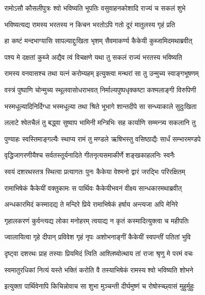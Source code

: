 \twolineshloka
{रामोऽसौ कौसलीपुत्रः श्वो भविष्यति भूपतिः}
{वसुवाहनकोशादि राज्यं च सकलं शुभे} %

\twolineshloka
{भविष्यत्यद्य रामस्य भरतस्य न किचन}
{भरतोऽपि गतो दूरं मातुलस्य गृहं प्रति} %

\twolineshloka
{हा कष्टं मन्दभाग्यासि सापल्याद्दुःखिता भृशम्}
{सैवमाकर्ण्य कैकेयी कुब्जामिदमथाब्रवीत्} %

\twolineshloka
{पश्य मे दक्षतां कुब्जे अद्यैव त्वं विचक्षणे}
{यथा तु सकलं राज्यं भरतस्य भविष्यति} %

\twolineshloka
{रामस्य वनवासश्च तथा यत्नं करोम्यहम्}
{इत्युक्त्वा मन्थरां सा तु उन्मुच्य स्वाङ्गभूषणम्} %

\twolineshloka
{वस्त्रं पुष्पाणि चोन्मुच्य स्थूलवासोधराभवत्}
{निर्माल्यपुष्पधृक्कष्टा कश्मलाङ्गी विरुपिणी} %

\twolineshloka
{भस्मधूल्यादिनिर्दिग्धा भस्मधूल्या तथा श्रिते}
{भूभागे शान्तदीपे सा सन्ध्याकाले सुदुःखिता} %

\twolineshloka
{ललाटे श्वेतचैलं तु बद्ध्वा सुष्वाप भामिनी}
{मन्त्रिभिः सह कार्याणि सम्मन्त्र्य सकलानि तु} %

\twolineshloka
{पुण्याहः स्वस्तिमाङ्गल्यैः स्थाप्य रामं तु मण्डले}
{ऋषिभस्तु वसिष्ठाद्यैः सार्धं सम्भारमण्डपे} %

\twolineshloka
{वृद्धिजागरणीयैश्च सर्वतस्तूर्यनादिते}
{गीतनृत्यसमाकीर्णे शङ्खकाहलनिः स्वनैः} %

\twolineshloka
{स्वयं दशरथस्तत्र स्थित्वा प्रत्यागतः पुनः}
{कैकेया वेश्मनो द्वारं जरद्भिः परिरक्षितम्} %

\twolineshloka
{रामाभिषेकं कैकेयीं वक्तुकामः स पार्थिवः}
{कैकेयीभवनं वीक्ष्य सान्धकारमथाब्रवीत्} %

\twolineshloka
{अन्धकारमिदं कस्मादद्य ते मन्दिरे प्रिये}
{रामाभिषेकं हर्षाय अन्त्यजा अपि मेनिरे} %

\twolineshloka
{गृहालकरणं कुर्वन्त्यद्य लोका मनोहरम्}
{त्वयाद्य न कृतं कस्मादित्युक्त्वा च महीपतिः} %

\twolineshloka
{ज्वालायित्वा गृहे दीपान् प्रविवेश गृहं नृपः}
{अशोभनाङ्गीं कैकेयीं स्वपन्तीं पतितां भुवि} %

\twolineshloka
{दृष्ट्वा दशरथः प्राह तस्याः प्रियमिदं त्विति}
{आश्लिष्योत्थाय तां राजा श्रृणु मे परमं वचः} %

\twolineshloka
{स्वमातुरधिकां नित्यं यस्ते भक्तिं करोति वै}
{तस्याभिषेकं रामस्य श्वो भविष्यति शोभने} %

\twolineshloka
{इत्युक्ता पार्थिवेनापि किचिन्नोवाच सा शुभा}
{मुञ्चन्ती दीर्घमुष्णं च रोषोस्च्छ्वासं मुहुर्मुहुः} %

